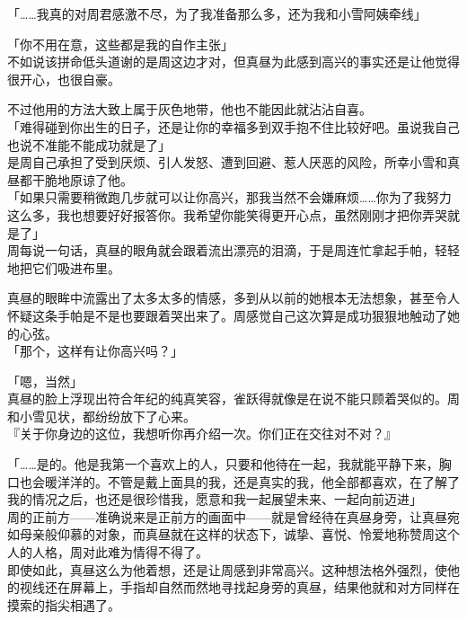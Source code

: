 「……我真的对周君感激不尽，为了我准备那么多，还为我和小雪阿姨牵线」

「你不用在意，这些都是我的自作主张」\\

不如说该拼命低头道谢的是周这边才对，但真昼为此感到高兴的事实还是让他觉得很开心，也很自豪。

不过他用的方法大致上属于灰色地带，他也不能因此就沾沾自喜。\\

「难得碰到你出生的日子，还是让你的幸福多到双手抱不住比较好吧。虽说我自己也说不准能不能成功就是了」\\

是周自己承担了受到厌烦、引人发怒、遭到回避、惹人厌恶的风险，所幸小雪和真昼都干脆地原谅了他。\\

「如果只需要稍微跑几步就可以让你高兴，那我当然不会嫌麻烦……你为了我努力这么多，我也想要好好报答你。我希望你能笑得更开心点，虽然刚刚才把你弄哭就是了」\\

周每说一句话，真昼的眼角就会跟着流出漂亮的泪滴，于是周连忙拿起手帕，轻轻地把它们吸进布里。

真昼的眼眸中流露出了太多太多的情感，多到从以前的她根本无法想象，甚至令人怀疑这条手帕是不是也要跟着哭出来了。周感觉自己这次算是成功狠狠地触动了她的心弦。\\

「那个，这样有让你高兴吗？」

「嗯，当然」\\

真昼的脸上浮现出符合年纪的纯真笑容，雀跃得就像是在说不能只顾着哭似的。周和小雪见状，都纷纷放下了心来。\\

『关于你身边的这位，我想听你再介绍一次。你们正在交往对不对？』

「……是的。他是我第一个喜欢上的人，只要和他待在一起，我就能平静下来，胸口也会暖洋洋的。不管是戴上面具的我，还是真实的我，他全部都喜欢，在了解了我的情况之后，也还是很珍惜我，愿意和我一起展望未来、一起向前迈进」\\

周的正前方——准确说来是正前方的画面中——就是曾经待在真昼身旁，让真昼宛如母亲般仰慕的对象，而真昼就在这样的状态下，诚挚、喜悦、怜爱地称赞周这个人的人格，周对此难为情得不得了。\\

即使如此，真昼这么为他着想，还是让周感到非常高兴。这种想法格外强烈，使他的视线还在屏幕上，手指却自然而然地寻找起身旁的真昼，结果他就和对方同样在摸索的指尖相遇了。\\

